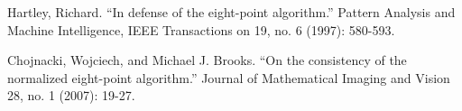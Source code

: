 \documentclass{article}
\begin{document}

\begin{thebibliography}{99}
	Hartley, Richard. ``In defense of the eight-point algorithm.'' Pattern Analysis and Machine Intelligence, IEEE Transactions on 19, no. 6 (1997): 580-593.

	Chojnacki, Wojciech, and Michael J. Brooks. ``On the consistency of the normalized eight-point algorithm.'' Journal of Mathematical Imaging and Vision 28, no. 1 (2007): 19-27.
\end{thebibliography}
\end{document}
